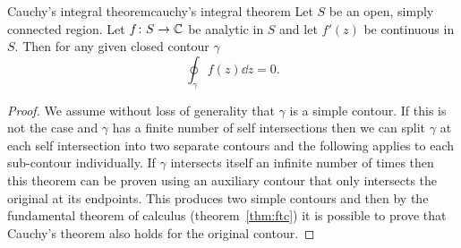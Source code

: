 \documentclass{article}
\begin{document}
    \begin{theorem}{Cauchy's integral theorem}{cauchy's integral theorem}
        Let \(S\) be an open, simply connected region.
        Let \(f\colon S\to\mathbb{C}\) be analytic in \(S\) and let \(f'(z)\) be continuous in \(S\).
        Then for any given closed contour \(\gamma\)
        \[\oint_{\gamma} f(z) \dd{z} = 0.\]
    \end{theorem}
    \begin{proof}
        We assume without loss of generality that \(\gamma\) is a simple contour.
        If this is not the case and \(\gamma\) has a finite number of self intersections then we can split \(\gamma\) at each self intersection into two separate contours and the following applies to each sub-contour individually.
        If \(\gamma\) intersects itself an infinite number of times then this theorem can be proven using an auxiliary contour that only intersects the original at its endpoints.
        This produces two simple contours and then by the fundamental theorem of calculus (theorem~\ref{thm:ftc}) it is possible to prove that Cauchy's theorem also holds for the original contour.
        

\end{proof}
\end{document}
